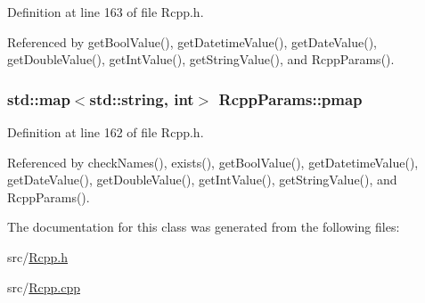 Definition at line 163 of file Rcpp.h.

Referenced by getBoolValue(), getDatetimeValue(), getDateValue(), getDoubleValue(), getIntValue(), getStringValue(), and RcppParams().\hypertarget{classRcppParams_399697fc90ba3136c61dd6e20931bd8b}{
\subsubsection[{pmap}]{\setlength{\rightskip}{0pt plus 5cm}std::map$<$std::string, int$>$ {\bf RcppParams::pmap}}}
\label{classRcppParams_399697fc90ba3136c61dd6e20931bd8b}




Definition at line 162 of file Rcpp.h.

Referenced by checkNames(), exists(), getBoolValue(), getDatetimeValue(), getDateValue(), getDoubleValue(), getIntValue(), getStringValue(), and RcppParams().

The documentation for this class was generated from the following files:\begin{CompactItemize}
\item 
src/\hyperlink{Rcpp_8h}{Rcpp.h}\item 
src/\hyperlink{Rcpp_8cpp}{Rcpp.cpp}\end{CompactItemize}
